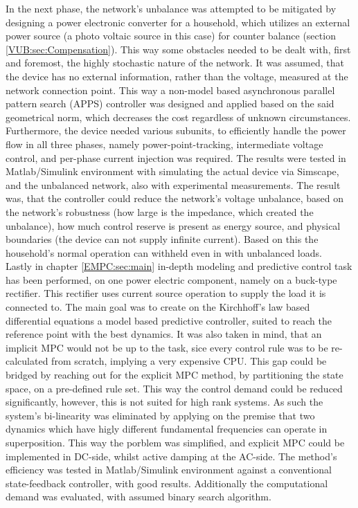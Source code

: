 In the next phase, the network's unbalance was attempted to be mitigated by designing a power electronic converter for a household, which utilizes an external power source (a photo voltaic source in this case) for counter balance (section \ref{VUB:sec:Compensation}). This way some obstacles needed to be dealt with, first and foremost, the highly stochastic nature of the network. It was assumed, that the device has no external information, rather than the voltage, measured at the network connection point. This way a non-model based asynchronous parallel pattern search (APPS) controller was designed and applied based on the said geometrical norm, which decreases the cost regardless of unknown circumstances. Furthermore, the device needed various subunits, to efficiently handle the power flow in all three phases, namely power-point-tracking, intermediate voltage control, and per-phase current injection was required. The results were tested in Matlab/Simulink environment with simulating the actual device via Simscape, and the unbalanced network, also with experimental measurements. The result was, that the controller could reduce the network's voltage unbalance, based on the network's robustness (how large is the impedance, which created the unbalance), how much control reserve is present as energy source, and physical boundaries (the device can not supply infinite current). Based on this the household's normal operation can withheld even in with unbalanced loads.\\
Lastly in chapter \ref{EMPC:sec:main} in-depth modeling and predictive control task has been performed, on one power electric component, namely on a buck-type rectifier. This rectifier uses current source operation to supply the load it is connected to. The main goal was to create on the Kirchhoff's law based differential equations a model based predictive controller, suited to reach the reference point with the best dynamics. It was also taken in mind, that an implicit MPC would not be up to the task, sice every control rule was to be re-calculated from scratch, implying a very expensive CPU. This gap could be bridged by reaching out for the explicit MPC method, by partitioning the state space, on a pre-defined rule set. This way the control demand could be reduced significantly, however, this is not suited for high rank systems. As such the system's bi-linearity was eliminated by applying on the premise that two dynamics which have higly different fundamental frequencies can operate in superposition. This way the porblem was simplified, and explicit MPC could be implemented in DC-side, whilst active damping at the AC-side. The method's efficiency was tested in Matlab/Simulink environment against a conventional state-feedback controller, with good results. Additionally the computational demand was evaluated, with assumed binary search algorithm.\\

